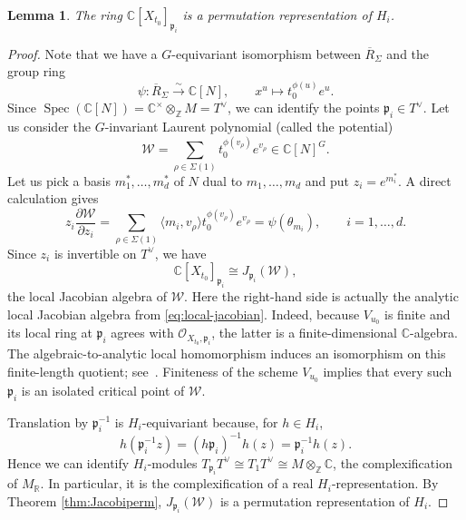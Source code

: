 \documentclass[12pt]{amsart}
\newtheorem{lemma}[theorem]{Lemma}
\theoremstyle{remark}
\begin{document}
\begin{lemma}\label{lem:iso3}
The ring $\mathbb{C}[X_{t_0}]_{\mathfrak{p}_i}$ is a permutation representation of $H_i$. 
\end{lemma}
\begin{proof}
Note that we have a $G$-equivariant isomorphism between $\overline{R}_\Sigma$ and the group ring
$$\psi:\overline{R}_\Sigma \stackrel{\sim}\longrightarrow
\mathbb{C}[N],\qquad 
x^u \longmapsto t_0^{\phi(u)}e^u.$$
Since 
$\operatorname{Spec}(\mathbb{C}[N])=\mathbb{C}^\times\otimes_{\mathbb{Z}}M=T^\vee$, we can identify the points $\mathfrak{p}_i\in T^\vee$. 
Let us consider the $G$-invariant Laurent polynomial (called the potential) 
\begin{equation}\label{eq:potential}
\mathcal{W} = \sum_{\rho\in \Sigma(1)} t_0^{\phi(v_\rho)}e^{v_\rho}\in \mathbb{C}[N]^G. 
\end{equation}
Let us pick a basis $m_1^*,\ldots,m_d^*$ of $N$ dual to $m_1,\ldots,m_d$ and put $z_i=e^{m_i^*}$. A direct calculation gives 
$$z_i 
\frac{\partial \mathcal{W}}{\partial z_i}
= \sum_{\rho\in \Sigma(1)}
\langle m_i,v_\rho\rangle t_0^{\phi(v_\rho)} e^{v_\rho}=\psi(\theta_{m_i}), \qquad i=1,\dots,d.$$
Since $z_i$ is invertible on $T^\vee$, we have 
$$\mathbb{C}[X_{t_0}]_{\mathfrak{p}_i}
\cong J_{\mathfrak{p}_i}(\mathcal{W}),$$
the local Jacobian algebra of $\mathcal{W}$.
Here the right-hand side is actually the analytic local Jacobian algebra from
\eqref{eq:local-jacobian}. 
Indeed, because \(V_{u_0}\) is finite and its local ring at \(\mathfrak p_i\) agrees with \(\mathcal O_{X_{t_0},\mathfrak p_i}\), the latter is a finite-dimensional \(\mathbb C\)-algebra. The algebraic-to-analytic local homomorphism induces an isomorphism on this finite-length quotient; see~\cite[Propositions~3, 28, and~29]{SerreGAGA}. 
Finiteness of the scheme $V_{u_0}$ implies that every such
$\mathfrak{p}_i$ is an isolated critical point of $\mathcal{W}$.

Translation by \(\mathfrak p_i^{-1}\) is \(H_i\)-equivariant because, for \(h\in H_i\),
\[
h(\mathfrak p_i^{-1}z)=(h\mathfrak p_i)^{-1}h(z)=\mathfrak p_i^{-1}h(z).
\]
Hence we can identify $H_i$-modules \(T_{\mathfrak p_i}T^\vee\cong T_1T^\vee\cong M\otimes_\mathbb Z\mathbb C\), the complexification of \(M_\mathbb R\).
In particular, it is the complexification of a real $H_i$-representation. 
By Theorem \ref{thm:Jacobiperm}, 
$J_{\mathfrak{p}_i}(\mathcal{W})$ is a permutation representation of $H_i$. 
\end{proof}
\end{document}
